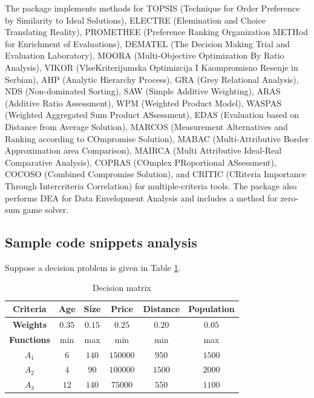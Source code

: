 \documentclass[authoryear,preprint,review,12pt]{elsarticle}
\begin{document}
The package implements methods for 
TOPSIS (Technique for Order Preference by Similarity to Ideal Solutions)\cite{topsis}, 
ELECTRE (Elemination and Choice Translating Reality)\cite{Roy1968}, 
PROMETHEE (Preference Ranking Organization METHod for Enrichment of Evaluations)\cite{Mareschal_2009}, 
DEMATEL (The Decision Making Trial and Evaluation Laboratory)\cite{Gabus1972}, 
MOORA (Multi-Objective Optimization By Ratio Analysis)\cite{brauers2006moora}, 
VIKOR (VlseKriterijumska Optimizcija I Kaompromisno Resenje in Serbian)\cite{opricovic1998multicriteria, opricovic2002multicriteria}, 
AHP (Analytic Hierarchy Process)\cite{saaty1977scaling}, 
GRA (Grey Relational Analysis)\cite{ju1982control}, 
NDS (Non-dominated Sorting)\cite{Deb_2002}, 
SAW (Simple Additive Weighting)\cite{RM-4823-ARPA, triantaphyllou1989examination}, 
ARAS (Additive Ratio Assessment)\cite{zavadskas2010new}, 
WPM (Weighted Product Model)\cite{RM-4823-ARPA, triantaphyllou1989examination}, 
WASPAS (Weighted Aggregated Sum Product ASsessment)\cite{Zavadskas_Turskis_Antucheviciene_Zakarevicius_2012}, 
EDAS (Evaluation based on Distance from Average Solution)\cite{keshavarz2015multi}, 
MARCOS (Measurement Alternatives and Ranking according to COmpromise Solution)\cite{stevic2020sustainable}, 
MABAC (Multi-Attributive Border Approximation area Comparison)\cite{pamuvcar2015selection}, 
MAIRCA (Multi Attributive Ideal-Real Comparative Analysis)\cite{pamuvcar2014selection}, 
COPRAS (COmplex PRoportional ASsessment)\cite{vsaparauskas2011selection}, 
COCOSO (Combined Compromise Solution)\cite{yazdani2019combined}, 
and CRITIC (CRiteria Importance Through Intercriteria Correlation)\cite{diakoulaki1995determining} for multiple-criteria tools. 
The package also performs DEA for Data Envelopment Analysis\cite{charnes1978measuring} and includes a method for zero-sum game solver.  



\subsection{Sample code snippets analysis}
\label{section:sample_code}

Suppose a decision problem is given in Table \ref{table:example_problem}.

\begin{table}[H]
	\centering
	\begin{tabular}{|c|c|c|c|c|c|}
		\hline
		\textbf{Criteria} & {Age} & {Size} &  {Price} & {Distance} & {Population}\\
		\hline
		\textbf{Weights} & {$0.35$} & {$0.15$} & {$0.25$}& {$0.20$} & {$0.05$} \\
		\hline
		\textbf{Functions} & min  & max & min & min & max\\
		\hline
		\hline
		{$A_1$} & {$6$} & {$140$} & $150000$ & {$950$} & $1500$\\
		\hline
		{$A_2$} & {$4$} & {$90$} & $100000$ & {$1500$} & $2000$\\
		\hline
		{$A_3$} & {$12$} & {$140$} & $75000$ & {$550$} & $1100$\\
		\hline
	\end{tabular}
	\caption{Decision matrix}
	\label{table:example_problem} 
\end{table}
\end{document}
